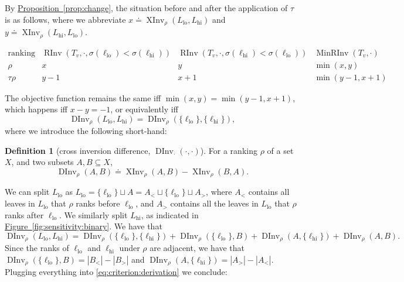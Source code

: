 \documentclass[11pt]{article}
\numberwithin{equation}{section}
\theoremstyle{definition}
\newtheorem{definition}[theorem]{Definition}
\theoremstyle{plain}
\newcommand{\expref}[2]{\hyperref[#2]{#1~\ref{#2}}}
\newcommand{\ranking}{\rho}
\newcommand{\ordering}{\sigma}
\newcommand{\transposition}{\tau}
\DeclareMathOperator{\XInv}{XInv}
\DeclareMathOperator{\DInv}{DInv}
\DeclareMathOperator{\MRInv}{MinRInv}
\DeclareMathOperator{\RInv}{RInv}
\newcommand{\lo}{\mathrm{lo}}
\newcommand{\hi}{\mathrm{hi}}
\begin{document}
By \expref{Proposition}{prop:change}, the situation before and after the application of $\transposition$ is as follows, where we abbreviate $x \doteq \XInv_\ranking(L_\lo,L_\hi)$ and $y \doteq \XInv_\ranking(L_\hi,L_\lo)$. 

\begin{equation*}
    \begin{array}{c|cc|c}
      \text{ranking} & \RInv(T_v,\cdot, \ordering(\ell_\lo) < \ordering(\ell_\hi)) &  \RInv(T_v,\cdot, \ordering(\ell_\hi) < \ordering(\ell_\lo)) & \MRInv(T_v,\cdot) \\
      \hline
      \ranking & x & y & \min(x,y) \\
      \transposition \ranking & y-1 & x+1 & \min(y-1,x+1)
    \end{array}
\end{equation*}

The objective function remains the same iff $\min(x,y) = \min(y-1,x+1)$, which happens iff $x-y=-1$, or equivalently iff
\begin{equation}\label{eq:criterion:derivation}
\DInv_\ranking(L_\lo,L_\hi) = \DInv_\ranking(\{\ell_\lo\},\{\ell_\hi\}),
\end{equation}
where we introduce the following short-hand: 
\begin{definition}[cross inversion difference, $\DInv_{\cdot}(\cdot,\cdot)$]
For a ranking $\ranking$ of a set $X$, and two subsets $A, B \subseteq X$,
\[ \DInv_\ranking(A,B) \doteq \XInv_\ranking(A,B) - \XInv_\ranking(B,A). \]
\end{definition}
We can split $L_\lo$ as $L_\lo = \{\ell_\lo\} \sqcup A = A_< \sqcup \{\ell_\lo\} \sqcup A_>$, where $A_<$ contains all leaves in $L_\lo$ that $\ranking$ ranks before $\ell_\lo$, and $A_>$ contains all the leaves in $L_\lo$ that $\ranking$ ranks after $\ell_\lo$. We similarly split $L_\hi$, as indicated in \expref{Figure}{fig:sensitivity:binary}. We have that
\[ \DInv_\ranking(L_\lo,L_\hi) = \DInv_\ranking(\{\ell_\lo\},\{\ell_\hi\}) + \DInv_\ranking(\{\ell_\lo\},B) + \DInv_\ranking(A,\{\ell_\hi\}) + \DInv_\ranking(A,B).\]
Since the ranks of $\ell_\lo$ and $\ell_\hi$ under $\ranking$ are adjacent, we have that $\DInv_\ranking(\{\ell_\lo\},B) = |B_<| - |B_>|$ and $\DInv_\ranking(A,\{\ell_\hi\}) = |A_>| - |A_<|$. Plugging everything into \eqref{eq:criterion:derivation} we conclude:
\end{document}
